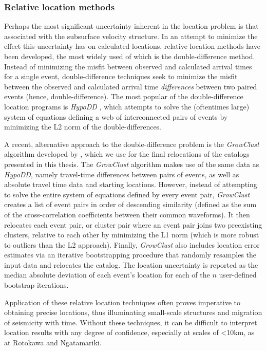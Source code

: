 \subsubsection{Relative location methods}
Perhaps the most significant uncertainty inherent in the location problem is that associated with the subsurface velocity structure. In an attempt to minimize the effect this uncertainty has on calculated locations, relative location methods have been developed, the most widely used of which is the double-difference method. Instead of minimizing the misfit between observed and calculated arrival times for a single event, double-difference techniques seek to minimize the misfit between the observed and calculated arrival time \textit{differences} between two paired events (hence, double-difference). The most popular of the double-difference location programs is \textit{HypoDD} \citep{Waldhauser_2000}, which attempts to solve the (oftentimes large) system of equations defining a web of interconnected pairs of events by minimizing the L2 norm of the double-differences.

A recent, alternative approach to the double-difference problem is the \textit{GrowClust} algorithm developed by \citet{Trugman_2017}, which we use for the final relocations of the catalogs presented in this thesis. The \textit{GrowClust} algorithm makes use of the same data as \textit{HypoDD}, namely travel-time differences between pairs of events, as well as absolute travel time data and starting locations. However, instead of attempting to solve the entire system of equations defined by every event pair, \textit{GrowClust} creates a list of event pairs in order of descending similarity (defined as the sum of the cross-correlation coefficients between their common waveforms). It then relocates each event pair, or cluster pair where an event pair joins two preexisting clusters, relative to each other by minimizing the L1 norm (which is more robust to outliers than the L2 approach). Finally, \textit{GrowClust} also includes location error estimates via an iterative bootstrapping procedure that randomly resamples the input data and relocates the catalog. The location uncertainty is reported as the median absolute deviation of each event's location for each of the $n$ user-defined bootstrap iterations.

Application of these relative location techniques often proves imperative to obtaining precise locations, thus illuminating small-scale structures and migration of seismicity with time. Without these techniques, it can be difficult to interpret location results with any degree of confidence, especially at scales of \textless{10}km, as at Rotokawa and Ngatamariki.

